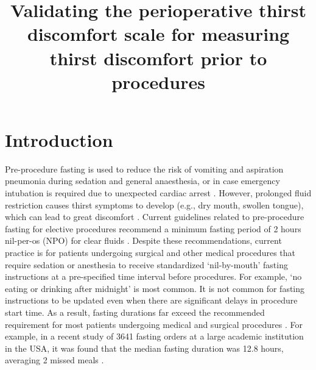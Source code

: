 \documentclass[12pt,twoside,]{pinp}
\title{Validating the perioperative thirst discomfort scale for
measuring thirst discomfort prior to procedures}
\author[]{}
\begin{document}
\verticaladjustment{-2pt}

\maketitle
\thispagestyle{firststyle}



\hypertarget{introduction}{%
\section{Introduction}\label{introduction}}

Pre-procedure fasting is used to reduce the risk of vomiting and
aspiration pneumonia during sedation and general anaesthesia, or in case
emergency intubation is required due to unexpected cardiac arrest
\citep{hamid2014pre, osborne2002preoperative}. However, prolonged fluid
restriction causes thirst symptoms to develop (e.g., dry mouth, swollen
tongue), which can lead to great discomfort
\citep{madsen1998perioperative}. Current guidelines related to
pre-procedure fasting for elective procedures recommend a minimum
fasting period of 2 hours nil-per-os (NPO) for clear fluids
\citep{dobsonGuidelinesPracticeAnesthesia2018}. Despite these
recommendations, current practice is for patients undergoing surgical
and other medical procedures that require sedation or anesthesia to
receive standardized `nil-by-mouth' fasting instructions at a
pre-specified time interval before procedures. For example, `no eating
or drinking after midnight' is most common. It is not common for fasting
instructions to be updated even when there are significant delays in
procedure start time. As a result, fasting durations far exceed the
recommended requirement for most patients undergoing medical and
surgical procedures
\citep{de2014actual, sorita2015frequency, spitz2017impact}. For example,
in a recent study of 3641 fasting orders at a large academic institution
in the USA, it was found that the median fasting duration was 12.8
hours, averaging 2 missed meals \citep{sorita2015frequency}.
\end{document}
